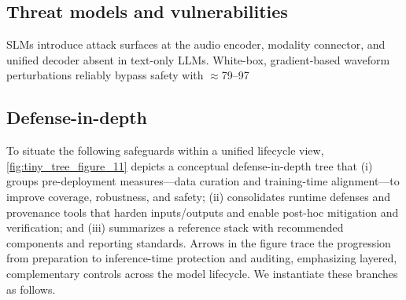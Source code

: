\documentclass{article}
\begin{document}
\subsection{Threat models and vulnerabilities} \label{subsec:Threat models and vulnerabilities}
SLMs introduce attack surfaces at the audio encoder, modality connector, and unified decoder absent in text-only LLMs. White-box, gradient-based waveform perturbations reliably bypass safety with $\approx$79--97%

\subsection{Defense-in-depth} \label{subsec:Defense-in-depth}
To situate the following safeguards within a unified lifecycle view, \autoref{fig:tiny_tree_figure_11} depicts a conceptual defense-in-depth tree that (i) groups pre-deployment measures---data curation and training-time alignment---to improve coverage, robustness, and safety; (ii) consolidates runtime defenses and provenance tools that harden inputs/outputs and enable post-hoc mitigation and verification; and (iii) summarizes a reference stack with recommended components and reporting standards. Arrows in the figure trace the progression from preparation to inference-time protection and auditing, emphasizing layered, complementary controls across the model lifecycle. We instantiate these branches as follows.
\end{document}
